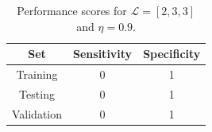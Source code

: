\documentclass[conference]{IEEEtran}
\theoremstyle{definition}
\theoremstyle{remark}
\theoremstyle{remark}
\begin{document}
\begin{table}[H]
  \centering
  \caption{Performance scores for $\mathcal{L}=[2,3,3]$ and $\eta=0.9$.}
  \label{tab:L233_emb}
  \begin{tabular}{ccc}
    \hline
    \textbf{Set} & \textbf{Sensitivity} & \textbf{Specificity} \\ \hline
    Training & 0 & 1 \\
    Testing & 0 & 1 \\
    Validation & 0 & 1 \\ \hline
  \end{tabular}
\end{table}
\end{document}
